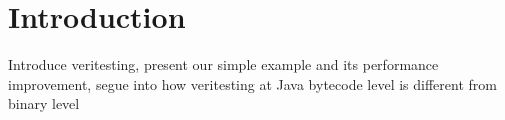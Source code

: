 \section{Introduction}
Introduce veritesting, present our simple example and its performance improvement, segue into how veritesting at Java bytecode level is different from binary level